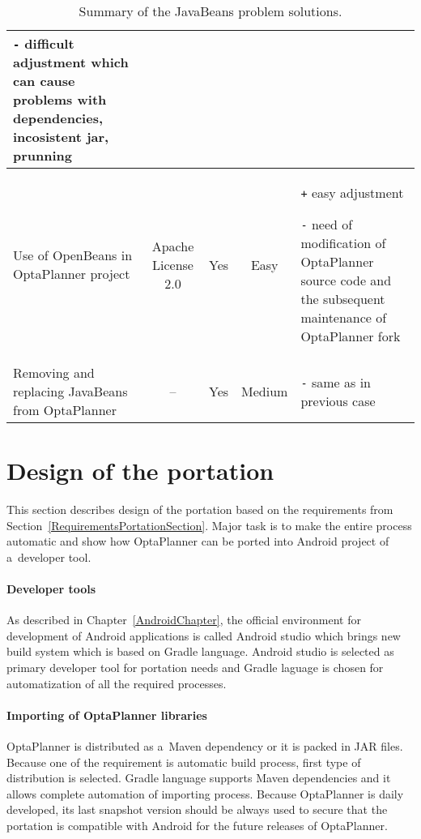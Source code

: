 \begin{table}[h!]
{\begin{tabular}{|l|c|c|c|p{5cm}|}
            \texttt{-} difficult adjustment which can cause problems with dependencies, incosistent jar, prunning
            \\ \hline

            \multicolumn{1}{|p{2.5cm}|}{Use of OpenBeans in OptaPlanner project} &
            \multicolumn{1}{p{2cm}|}{\centering Apache License 2.0} &
            Yes &
            Easy &
            \texttt{+} easy adjustment

            \texttt{-} need of modification of OptaPlanner source code and the subsequent maintenance of
            OptaPlanner fork \\ \hline

            \multicolumn{1}{|p{2.5cm}|}{Removing and replacing JavaBeans from OptaPlanner} &
            -- &
            Yes &
            Medium &
            \texttt{-} same as in previous case\\ \hline
        \end{tabular}
    }
    \centering
    \caption{Summary of the JavaBeans problem solutions.}
    \label{SummaryJavaBeansTable}
\end{table}

\section{Design of the portation}\label{PortationDesignSection}
This section describes design of the portation based on the requirements from
Section~\ref{RequirementsPortationSection}. Major task is to make the entire process automatic and show how OptaPlanner
can be ported into Android project of a~developer tool.

\paragraph{Developer tools}
As described in Chapter~\ref{AndroidChapter}, the official environment for development of Android applications is called
Android studio which brings new build system which is based on Gradle language. Android studio is selected as primary
developer tool for portation needs and Gradle laguage is chosen for automatization of all the required processes.

\paragraph{Importing of OptaPlanner libraries}
OptaPlanner is distributed as a~Maven dependency or it is packed in JAR files. Because one of the requirement is
automatic build process, first type of distribution is selected. Gradle language supports Maven dependencies and it
allows complete automation of importing process. Because OptaPlanner is daily developed, its last snapshot version
should be always used to secure that the portation is compatible with Android for the future releases of OptaPlanner.

